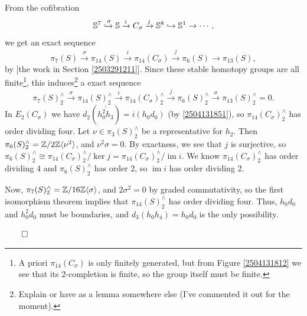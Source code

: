 \documentclass{MetricNotes2023}
\def\bb{\ensuremath\mathbb}
\def\subq{\ensuremath\subseteq}
\def\inj{\ensuremath\hookrightarrow}
\def\xinj{\ensuremath\xhookrightarrow}
\def\inte{\ensuremath\mathbb{Z}}
\DeclareMathOperator{\im}{im}
\def\done{\begin{flushright}\vspace{-4.35ex}\(\qed\)\end{flushright}}
\begin{document}
\begin{ourproof}
From the cofibration 
\[\bb{S}^7 \xinj{\sigma} \bb{S} \xrightarrow{i}C_\sigma \xrightarrow{j}\bb{S}^8 \inj \bb{S}^1 \to\cdots,\]
we get an exact sequence
\[\pi_{7}(S) \xrightarrow{\sigma} \pi_{14}(S) \xrightarrow{i} \pi_{14}(C_\sigma) \xrightarrow{j} \pi_6(S) \to \pi_{13}(S),\]
by [the work in Section \ref{2503291211}]. Since these stable homotopy groups are all finite\footnote{A priori \(\pi_{14}(C_\sigma)\) is only finitely generated, but from Figure \ref{2504131812} we see that its 2-completion is finite, so the group itself must be finite.}, this induces\footnote{Explain or have as a lemma somewhere else (I've commented it out for the moment).} a exact sequence
\[\pi_{7}(S)^\wedge_2 \xrightarrow{\sigma} \pi_{14}(S)^\wedge_2 \xrightarrow{i} \pi_{14}(C_\sigma)^\wedge_2 \xrightarrow{j} \pi_6(S)^\wedge_2 \xrightarrow{\sigma} \pi_{13}(S)^\wedge_2=0.\]
In \(E_2(C_\sigma)\) we have \(d_2(\overline{\overline{h_0^2h_3}})=i(h_0d_0)\) (by \ref{2504131851}), so \(\pi_{14}(C_\sigma)^\wedge_2\) has order dividing four. Let \(\nu \in \pi_3(S)^\wedge_2\) be a representative for \(h_2\). Then \(\pi_6(S)^\wedge_2=\inte/2\inte \ang{\nu^2}\), and \(\nu^2 \sigma=0\). By exactness, we see that \(j\) is surjective, so \(\pi_6(S)^\wedge_2\cong \pi_{14}(C_\sigma)^\wedge_2/\ker j=\pi_{14}(C_\sigma)^\wedge_2/\im i\). We know \(\pi_{14}(C_\sigma)^\wedge_2\) has order dividing 4 and \(\pi_6(S)^\wedge_2\) has order 2, so \(\im i\) has order dividing 2. 

Now, \(\pi_7(S)^\wedge_2=\inte/16\inte \ang{\sigma}\), and \(2 \sigma^2=0\) by graded commutativity, so the first isomorphism theorem implies that \(\pi_{14}(S)^\wedge_2\) has order dividing four. Thus, \(h_0d_0\) and \(h_0^2d_0\) must be boundaries, and \(d_3(h_0h_4)=h_0d_0\) is the only possibility.
\done
\end{ourproof}


\end{document}

